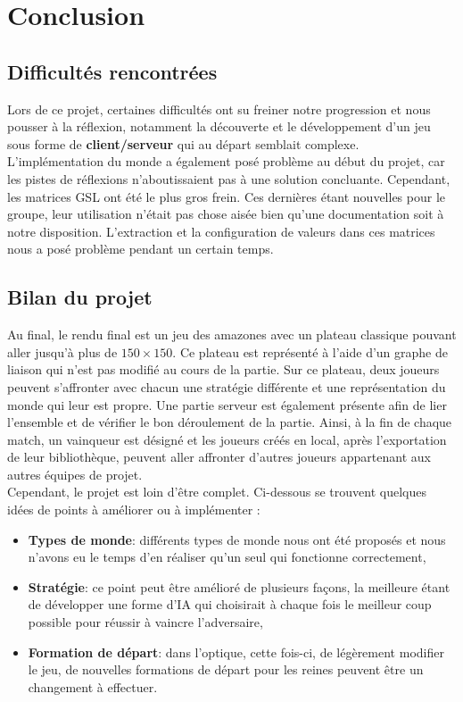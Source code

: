 \chapter{Conclusion}

\section{Difficultés rencontrées}

Lors de ce projet, certaines difficultés ont su freiner notre progression et nous pousser à la réflexion, notamment la découverte et le développement d'un jeu sous forme de \textbf{client/serveur} qui au départ semblait complexe. L'implémentation du monde a également posé problème au début du projet, car les pistes de réflexions n'aboutissaient pas à une solution concluante. Cependant, les matrices GSL ont été le plus gros frein. Ces dernières étant nouvelles pour le groupe, leur utilisation n'était pas chose aisée bien qu'une documentation soit à notre disposition. L'extraction et la configuration de valeurs dans ces matrices nous a posé problème pendant un certain temps.    

\section{Bilan du projet}
Au final, le rendu final est un jeu  des amazones avec un plateau classique pouvant aller jusqu'à plus de $150 \times 150$. Ce plateau est représenté à l'aide d'un graphe de liaison qui n'est pas modifié au cours de la partie. Sur ce plateau, deux joueurs peuvent s'affronter avec chacun une stratégie différente et une représentation du monde qui leur est propre. Une partie serveur est également présente afin de lier l'ensemble et de vérifier le bon déroulement de la partie. Ainsi, à la fin de chaque match, un vainqueur est désigné et les joueurs créés en local, après l'exportation de leur bibliothèque, peuvent aller affronter d'autres joueurs appartenant aux autres équipes de projet. 
\\
Cependant, le projet est loin d'être complet. Ci-dessous se trouvent quelques idées de points à améliorer ou à implémenter :
\medbreak
\begin{itemize}
    \item \textbf{Types de monde}: différents types de monde nous ont été proposés et nous n'avons eu le temps d'en réaliser qu'un seul qui fonctionne correctement,
    \item \textbf{Stratégie}: ce point peut être amélioré de plusieurs façons, la meilleure étant de développer une forme d'IA qui choisirait à chaque fois le meilleur coup possible pour réussir à vaincre l'adversaire,
    \item \textbf{Formation de départ}: dans l'optique, cette fois-ci, de légèrement modifier le jeu, de nouvelles formations de départ pour les reines peuvent être un changement à effectuer.
\end{itemize}

